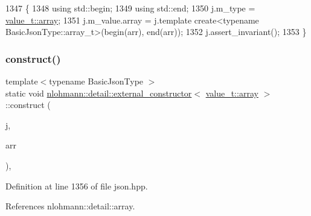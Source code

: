 \begin{DoxyCode}
1347     \{
1348         \textcolor{keyword}{using} std::begin;
1349         \textcolor{keyword}{using} std::end;
1350         j.m\_type = \hyperlink{namespacenlohmann_1_1detail_a1ed8fc6239da25abcaf681d30ace4985af1f713c9e000f5d3f280adbd124df4f5}{value\_t::array};
1351         j.m\_value.array = j.template create<typename BasicJsonType::array\_t>(begin(arr), end(arr));
1352         j.assert\_invariant();
1353     \}
\end{DoxyCode}
\mbox{\label{structnlohmann_1_1detail_1_1external__constructor_3_01value__t_1_1array_01_4_a4ebb19b1cb84b4cb224a4c5322e16f14}} 
\subsubsection{\texorpdfstring{construct()}{construct()}\hspace{0.1cm}{\footnotesize\ttfamily [4/5]}}
{\footnotesize\ttfamily template$<$typename Basic\+Json\+Type $>$ \\
static void \hyperlink{structnlohmann_1_1detail_1_1external__constructor}{nlohmann\+::detail\+::external\+\_\+constructor}$<$ \hyperlink{namespacenlohmann_1_1detail_a1ed8fc6239da25abcaf681d30ace4985af1f713c9e000f5d3f280adbd124df4f5}{value\+\_\+t\+::array} $>$\+::construct (\begin{DoxyParamCaption}\item[{Basic\+Json\+Type \&}]{j,  }\item[{const std\+::vector$<$ bool $>$ \&}]{arr }\end{DoxyParamCaption})\hspace{0.3cm}{\ttfamily [inline]}, {\ttfamily [static]}}



Definition at line 1356 of file json.\+hpp.



References nlohmann\+::detail\+::array.


